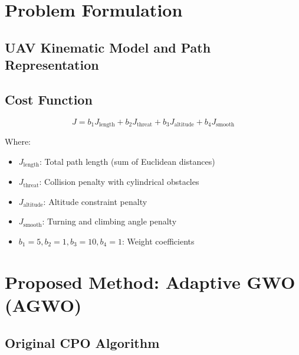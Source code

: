 \documentclass[12pt,a4paper]{article}
\begin{document}
\section{Problem Formulation}

\subsection{UAV Kinematic Model and Path Representation}

\subsection{Cost Function}
\begin{equation}
    J = b_1 J_{\text{length}} + b_2 J_{\text{threat}} + b_3 J_{\text{altitude}} + b_4 J_{\text{smooth}}
\end{equation}

Where:
\begin{itemize}
    \item $J_{\text{length}}$: Total path length (sum of Euclidean distances)
    \item $J_{\text{threat}}$: Collision penalty with cylindrical obstacles
    \item $J_{\text{altitude}}$: Altitude constraint penalty
    \item $J_{\text{smooth}}$: Turning and climbing angle penalty
    \item $b_1=5, b_2=1, b_3=10, b_4=1$: Weight coefficients
\end{itemize}

\section{Proposed Method: Adaptive GWO (AGWO)}

\subsection{Original CPO Algorithm}
\end{document}
